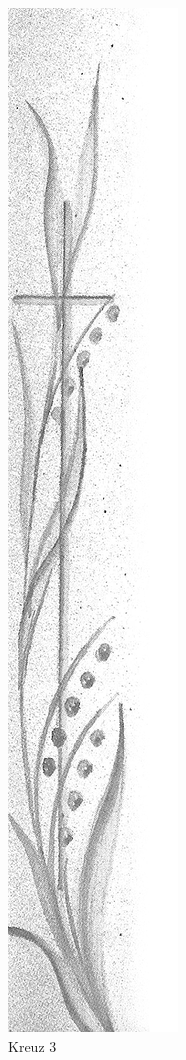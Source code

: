 \documentclass[ngerman,a4paper,11pt]{scrreprt}
\begin{document}
\begin{figure}[H]
\centering
\includegraphics[width=\textwidth,height=.8\textheight]{Bilder/Bilder/750_0010_15447_kreuz_pflanze.png}
\caption{Kreuz 3}
\end{figure}
\end{document}
